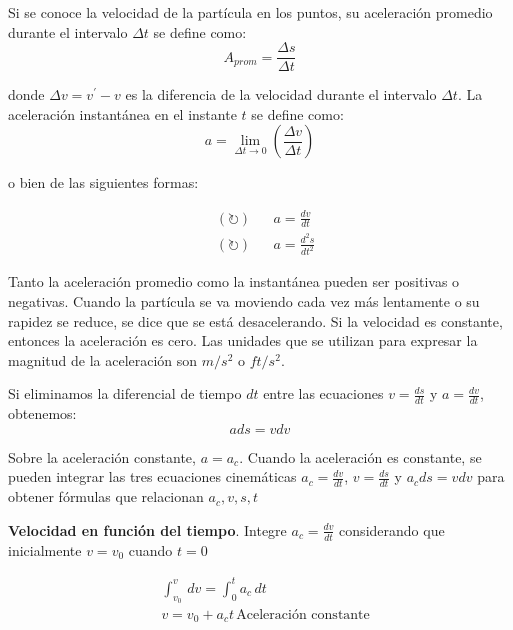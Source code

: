 \begin{definition}[Aceleración]
    Si se conoce la velocidad de la partícula en los puntos, su aceleración promedio durante el intervalo $\Delta t$ se define como:
    \begin{equation}
        A_{prom}=\frac{\Delta s}{\Delta t}
    \end{equation}
\end{definition}

donde $\Delta v=v^{\prime}-v$ es la diferencia de la velocidad durante el intervalo $\Delta t$. La aceleración instantánea en el instante $t$ se define como:
\begin{equation}
    a=\lim_{\Delta t\to 0} \left(\frac{\Delta v}{\Delta t}\right)
\end{equation}

\begin{notation}
    o bien de las siguientes formas:

    \begin{align*}
    &\left(\circlearrowright \right)&&a=\frac{dv}{dt}\\
    &\left(\circlearrowright \right)&&a=\frac{d^2 s}{d t^2}
    \end{align*}
\end{notation}


Tanto la aceleración promedio como la instantánea pueden ser positivas o negativas. Cuando la partícula se va moviendo cada vez más lentamente o su rapidez se reduce, se dice que se está desacelerando. Si la velocidad es constante, entonces la
aceleración es cero. Las unidades que se utilizan para expresar la magnitud de la aceleración son $m/s^2$ o $ft/s^2$.

Si eliminamos la diferencial de tiempo  $dt$ entre las ecuaciones $v=\frac{ds}{dt}$ y $a=\frac{dv}{dt}$, obtenemos:
\begin{equation}
    ads=vdv
\end{equation}

\begin{notation}
    Sobre la aceleración constante, $a=a_c$. Cuando la aceleración es constante, se pueden integrar las tres ecuaciones cinemáticas $a_c=\frac{dv}{dt}$, $v=\frac{ds}{dt}$ y $a_cds=vdv$ para obtener fórmulas que relacionan $a_c,v,s,t$
\end{notation}

\textbf{Velocidad en función del tiempo}. Integre $a_c=\frac{dv}{dt}$
considerando que inicialmente $v=v_0$ cuando $t=0$

\begin{align}
    &\int_{v_0}^{v}\, dv=\int_0^t a_c\, dt\\
    &v=v_0+a_ct\, \text{Aceleración constante}
\end{align}

